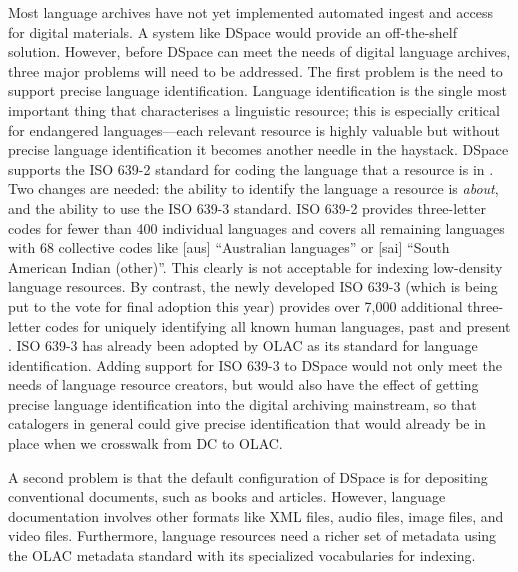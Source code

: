 
Most language archives have not yet implemented automated ingest and
access for digital materials.  A system like DSpace would provide 
an off-the-shelf solution.  
However, before DSpace can meet the needs of digital language archives,
three major problems will need to be addressed.
The first problem is the need to support precise language identification.
Language identification is the single most important thing that
characterises a linguistic resource; this is especially critical for
endangered languages---each relevant resource is highly valuable but
without precise language identification it becomes another needle in
the haystack. DSpace supports the ISO 639-2 standard for coding the
language that a resource is in \citep{ISO639-2}. Two changes are needed:
the ability to identify the language a resource is \emph{about}, and
the ability to use the ISO 639-3 standard.  ISO 639-2 provides
three-letter codes for fewer than 400 individual languages and covers all
remaining languages with 68 collective codes like [aus] ``Australian 
languages'' or [sai] ``South American Indian (other)''.  This clearly
is not acceptable for indexing low-density language resources.
By contrast, the newly developed ISO 639-3 (which is being put to
the vote for final adoption this year) provides over 7,000 additional
three-letter codes for uniquely identifying all known human languages,
past and present \citep{ISO639-3}.  ISO 639-3 has already been adopted by OLAC as its
standard for language identification.
Adding support for ISO 639-3 to DSpace would not only meet the
needs of language resource creators, but would also have the
effect of getting precise language identification into the 
digital archiving mainstream, so that catalogers in general could
give precise identification that would already be in place
when we crosswalk from DC to OLAC.


A second problem is that the default configuration of DSpace
is for depositing conventional documents, such as books and articles.
However, language documentation involves other formats like
XML files, audio files, image files, and video files. Furthermore,
language resources need a richer set of metadata using the OLAC 
metadata standard with its specialized vocabularies for indexing.

